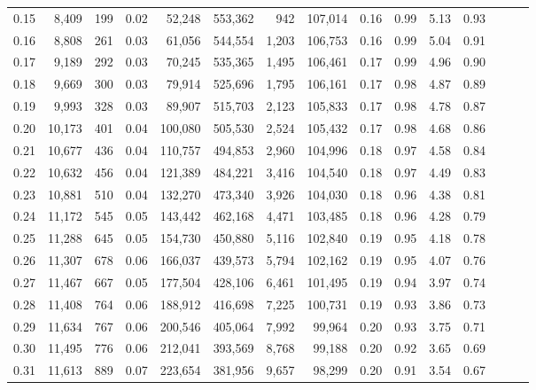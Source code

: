 \begin{tabular}{rrrrrrrrrrrrrrr}
0.15 &   8,409 &    199 &  0.02 &   52,248 &  553,362 &      942 &  107,014 &  0.16 &  0.99 &  5.13 &      0.93 \\
0.16 &   8,808 &    261 &  0.03 &   61,056 &  544,554 &    1,203 &  106,753 &  0.16 &  0.99 &  5.04 &      0.91 \\
0.17 &   9,189 &    292 &  0.03 &   70,245 &  535,365 &    1,495 &  106,461 &  0.17 &  0.99 &  4.96 &      0.90 \\
0.18 &   9,669 &    300 &  0.03 &   79,914 &  525,696 &    1,795 &  106,161 &  0.17 &  0.98 &  4.87 &      0.89 \\
0.19 &   9,993 &    328 &  0.03 &   89,907 &  515,703 &    2,123 &  105,833 &  0.17 &  0.98 &  4.78 &      0.87 \\
0.20 &  10,173 &    401 &  0.04 &  100,080 &  505,530 &    2,524 &  105,432 &  0.17 &  0.98 &  4.68 &      0.86 \\
0.21 &  10,677 &    436 &  0.04 &  110,757 &  494,853 &    2,960 &  104,996 &  0.18 &  0.97 &  4.58 &      0.84 \\
0.22 &  10,632 &    456 &  0.04 &  121,389 &  484,221 &    3,416 &  104,540 &  0.18 &  0.97 &  4.49 &      0.83 \\
0.23 &  10,881 &    510 &  0.04 &  132,270 &  473,340 &    3,926 &  104,030 &  0.18 &  0.96 &  4.38 &      0.81 \\
0.24 &  11,172 &    545 &  0.05 &  143,442 &  462,168 &    4,471 &  103,485 &  0.18 &  0.96 &  4.28 &      0.79 \\
0.25 &  11,288 &    645 &  0.05 &  154,730 &  450,880 &    5,116 &  102,840 &  0.19 &  0.95 &  4.18 &      0.78 \\
0.26 &  11,307 &    678 &  0.06 &  166,037 &  439,573 &    5,794 &  102,162 &  0.19 &  0.95 &  4.07 &      0.76 \\
0.27 &  11,467 &    667 &  0.05 &  177,504 &  428,106 &    6,461 &  101,495 &  0.19 &  0.94 &  3.97 &      0.74 \\
0.28 &  11,408 &    764 &  0.06 &  188,912 &  416,698 &    7,225 &  100,731 &  0.19 &  0.93 &  3.86 &      0.73 \\
0.29 &  11,634 &    767 &  0.06 &  200,546 &  405,064 &    7,992 &   99,964 &  0.20 &  0.93 &  3.75 &      0.71 \\
0.30 &  11,495 &    776 &  0.06 &  212,041 &  393,569 &    8,768 &   99,188 &  0.20 &  0.92 &  3.65 &      0.69 \\
0.31 &  11,613 &    889 &  0.07 &  223,654 &  381,956 &    9,657 &   98,299 &  0.20 &  0.91 &  3.54 &      0.67 \\

\end{tabular}
